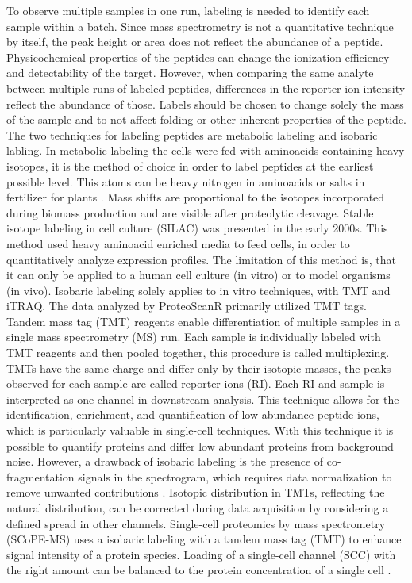 \documentclass[
  11pt,
]{article}
\begin{document}
To observe multiple samples in one run, labeling is needed to identify
each sample within a batch. Since mass spectrometry is not a
quantitative technique by itself, the peak height or area does not
reflect the abundance of a peptide. Physicochemical properties of the
peptides can change the ionization efficiency and detectability of the
target. However, when comparing the same analyte between multiple runs
of labeled peptides, differences in the reporter ion intensity reflect
the abundance of those. Labels should be chosen to change solely the
mass of the sample and to not affect folding or other inherent
properties of the peptide. The two techniques for labeling peptides are
metabolic labeling and isobaric labling. In metabolic labeling the cells
were fed with aminoacids containing heavy isotopes, it is the method of
choice in order to label peptides at the earliest possible level. This
atoms can be heavy nitrogen in aminoacids or salts in fertilizer for
plants \citep{Karen2012}. Mass shifts are proportional to the isotopes
incorporated during biomass production and are visible after proteolytic
cleavage. Stable isotope labeling in cell culture (SILAC) was presented
in the early 2000s. This method used heavy aminoacid enriched media to
feed cells, in order to quantitatively analyze expression profiles. The
limitation of this method is, that it can only be applied to a human
cell culture (in vitro) or to model organisms (in vivo). Isobaric
labeling solely applies to in vitro techniques, with TMT and iTRAQ. The
data analyzed by ProteoScanR primarily utilized TMT tags. Tandem mass
tag (TMT) reagents enable differentiation of multiple samples in a
single mass spectrometry (MS) run. Each sample is individually labeled
with TMT reagents and then pooled together, this procedure is called
multiplexing. TMTs have the same charge and differ only by their
isotopic masses, the peaks observed for each sample are called reporter
ions (RI). Each RI and sample is interpreted as one channel in
downstream analysis. This technique allows for the identification,
enrichment, and quantification of low-abundance peptide ions, which is
particularly valuable in single-cell techniques. With this technique it
is possible to quantify proteins and differ low abundant proteins from
background noise. However, a drawback of isobaric labeling is the
presence of co-fragmentation signals in the spectrogram, which requires
data normalization to remove unwanted contributions
\citep{Marx2019, Budnik2018}. Isotopic distribution in TMTs, reflecting
the natural distribution, can be corrected during data acquisition by
considering a defined spread in other channels. Single-cell proteomics
by mass spectrometry (SCoPE-MS) uses a isobaric labeling with a tandem
mass tag (TMT) to enhance signal intensity of a protein species. Loading
of a single-cell channel (SCC) with the right amount can be balanced to
the protein concentration of a single cell \citep{Ye2022}.
\end{document}
